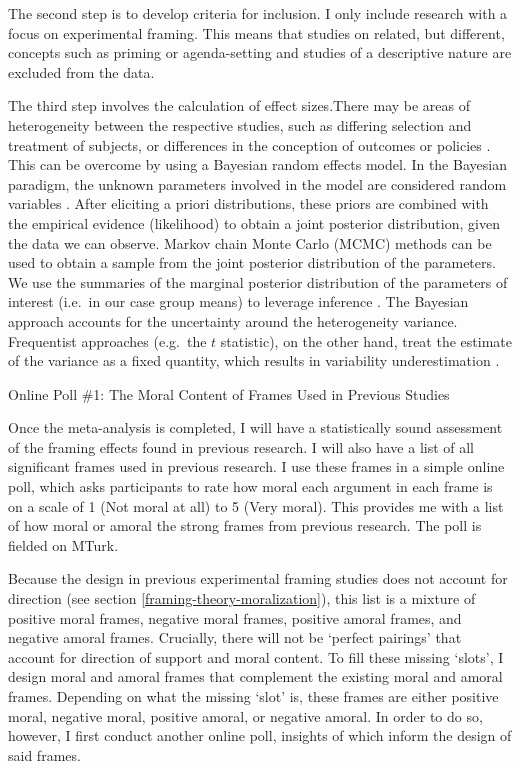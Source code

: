\documentclass[12pt,]{article}
\makeatletter
\renewcommand\subsubsection{\@startsection{subsubsection}{3}{\z@}
                                     {-3.25ex\@plus -1ex \@minus -.2ex}
                                     {1.5ex \@plus .2ex}
                                     {\normalsize\itshape}} %
\makeatother
\begin{document}
The second step is to develop criteria for inclusion. I only include
research with a focus on experimental framing. This means that studies
on related, but different, concepts such as priming or agenda-setting
and studies of a descriptive nature are excluded from the data.

The third step involves the calculation of effect sizes.There may be
areas of heterogeneity between the respective studies, such as differing
selection and treatment of subjects, or differences in the conception of
outcomes or policies \citep{roever_2017_bayesian}. This can be overcome
by using a Bayesian random effects model. In the Bayesian paradigm, the
unknown parameters involved in the model are considered random variables
\citep{gelman_2013_bayesian}. After eliciting a priori distributions,
these priors are combined with the empirical evidence (likelihood) to
obtain a joint posterior distribution, given the data we can observe.
Markov chain Monte Carlo (MCMC) methods can be used to obtain a sample
from the joint posterior distribution of the parameters. We use the
summaries of the marginal posterior distribution of the parameters of
interest (i.e.~in our case group means) to leverage inference \citep[all
from][]{gill_2014_bayesian}. The Bayesian approach accounts for the
uncertainty around the heterogeneity variance. Frequentist approaches
(e.g.~the \(t\) statistic), on the other hand, treat the estimate of the
variance as a fixed quantity, which results in variability
underestimation \citep{lau_1999_effects}.

\subsubsection{Online Poll \#1: The Moral Content of Frames Used in
Previous Studies}\label{framing-data-poll-previous}

Once the meta-analysis is completed, I will have a statistically sound
assessment of the framing effects found in previous research. I will
also have a list of all significant frames used in previous research. I
use these frames in a simple online poll, which asks participants to
rate how moral each argument in each frame is on a scale of 1 (Not moral
at all) to 5 (Very moral). This provides me with a list of how moral or
amoral the strong frames from previous research. The poll is fielded on
MTurk.

Because the design in previous experimental framing studies does not
account for direction (see section \ref{framing-theory-moralization}),
this list is a mixture of positive moral frames, negative moral frames,
positive amoral frames, and negative amoral frames. Crucially, there
will not be `perfect pairings' that account for direction of support and
moral content. To fill these missing `slots', I design moral and amoral
frames that complement the existing moral and amoral frames. Depending
on what the missing `slot' is, these frames are either positive moral,
negative moral, positive amoral, or negative amoral. In order to do so,
however, I first conduct another online poll, insights of which inform
the design of said frames.
\end{document}
